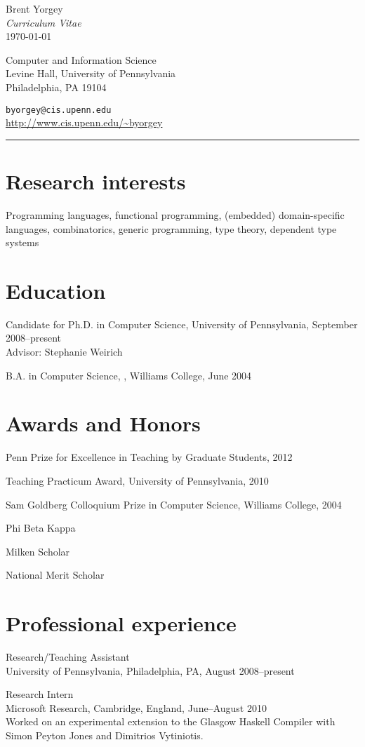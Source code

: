 \documentclass{article}
\newcommand{\cvitem}{\par\hangpara{2em}{1}}
\begin{document}
\begin{center}
  {\huge Brent Yorgey} \\
  \emph{Curriculum Vitae} \\
  \today
\end{center}

\noindent
\parbox{2.5in}{
Computer and Information Science \\
Levine Hall, University of Pennsylvania \\
Philadelphia, PA 19104
}
\hfill
\parbox{2.5in}{
\texttt{byorgey@cis.upenn.edu} \\
\url{http://www.cis.upenn.edu/~byorgey}
}
\medskip

\hrule

\section*{Research interests}
Programming languages, functional programming, (embedded)
domain-specific languages, combinatorics, generic programming, type
theory, dependent type systems

\section*{Education}
\cvitem
Candidate for Ph.D. in Computer Science, University of Pennsylvania,
September 2008--present \\
Advisor: Stephanie Weirich

\cvitem B.A. in Computer Science, , Williams
College, June 2004

\section*{Awards and Honors}
\cvitem Penn Prize for Excellence in Teaching by Graduate Students, 2012
\cvitem Teaching Practicum Award, University of Pennsylvania, 2010
\cvitem Sam Goldberg Colloquium Prize in Computer Science, Williams
College, 2004
\cvitem Phi Beta Kappa
\cvitem Milken Scholar
\cvitem National Merit Scholar

\section*{Professional experience}
\cvitem
Research/Teaching Assistant \\
University of Pennsylvania, Philadelphia, PA, August 2008--present

\cvitem
Research Intern \\
Microsoft Research, Cambridge, England, June--August 2010 \\
Worked on an experimental extension to the Glasgow Haskell Compiler with
Simon Peyton Jones and Dimitrios Vytiniotis.
\end{document}
